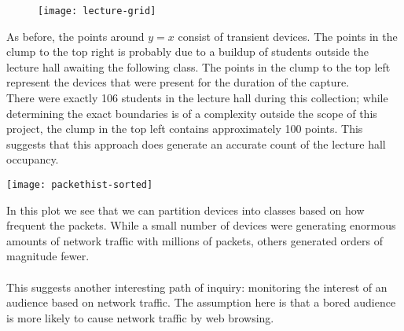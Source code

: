 \documentclass[12pt,journal,compsoc]{IEEEtran}
\begin{document}
	\begin{figure}[H]
		\texttt{[image: lecture-grid]}
		\end{figure}

	As before, the points around \(y=x\) consist of transient devices.
	The points in the clump to the top right is probably due to a buildup of students outside the lecture hall awaiting the following class.
	The points in the clump to the top left represent the devices that were present for the duration of the capture.
	\\
	There were exactly 106 students in the lecture hall during this collection; while determining the exact boundaries is of a complexity outside the scope of this project, the clump in the top left contains approximately 100 points.
	This suggests that this approach does generate an accurate count of the lecture hall occupancy.

	\begin{figure*}[!t]
		\texttt{[image: packethist-sorted]}
		\end{figure*}

	In this plot we see that we can partition devices into classes based on how frequent the packets.
	While a small number of devices were generating enormous amounts of network traffic with millions of packets, others generated orders of magnitude fewer.
	\\\\
	This suggests another interesting path of inquiry: monitoring the interest of an audience based on network traffic.
	The assumption here is that a bored audience is more likely to cause network traffic by web browsing.
\end{document}
